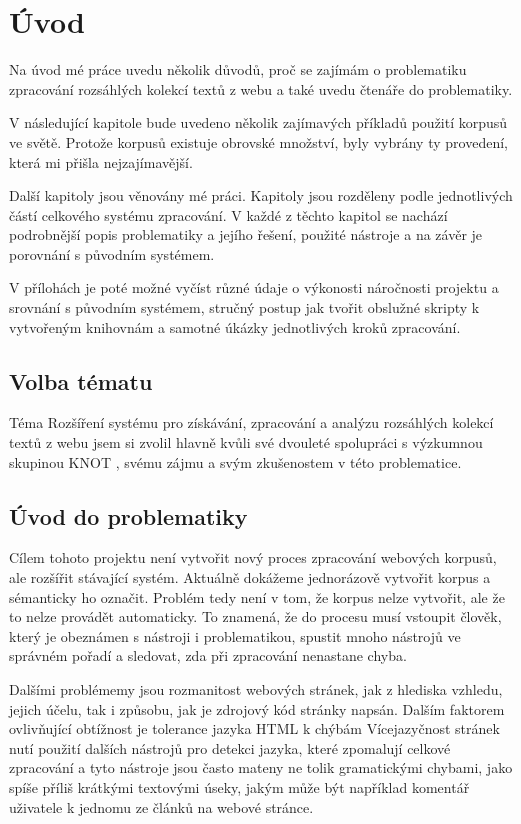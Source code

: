 
\chapter{Úvod}
Na úvod mé práce uvedu několik důvodů, proč se zajímám o problematiku zpracování
rozsáhlých kolekcí textů z webu a také uvedu čtenáře do problematiky.

V následující kapitole bude uvedeno několik zajímavých příkladů použití korpusů ve světě.
Protože korpusů existuje obrovské množství, byly vybrány ty provedení, která mi přišla
nejzajímavější.

Další kapitoly jsou věnovány mé práci. Kapitoly jsou rozděleny podle jednotlivých částí celkového
systému zpracování. V každé z těchto kapitol se nachází podrobnější popis
problematiky a jejího řešení, použité nástroje a na závěr je porovnání
s původním systémem.

V přílohách je poté možné vyčíst různé údaje o výkonosti náročnosti projektu a srovnání s původním systémem,
stručný postup jak tvořit obslužné skripty k vytvořeným knihovnám a
samotné úkázky jednotlivých kroků zpracování.

\section{Volba tématu}
Téma Rozšíření systému pro získávání, zpracování a analýzu rozsáhlých kolekcí textů z webu
jsem si zvolil hlavně kvůli své dvouleté spolupráci s výzkumnou skupinou KNOT \cite{KNOT}, svému zájmu a
svým zkušenostem v této problematice.

\section{Úvod do problematiky}
Cílem tohoto projektu není vytvořit nový proces zpracování webových korpusů, ale rozšířit stávající
systém. Aktuálně dokážeme jednorázově vytvořit korpus a sémanticky ho označit. Problém tedy není v tom,
že korpus nelze vytvořit, ale že to nelze provádět automaticky. To znamená, že do procesu musí vstoupit
člověk, který je obeznámen s nástroji i problematikou, spustit mnoho nástrojů ve správném pořadí a
sledovat, zda při zpracování nenastane chyba.

Dalšími problémemy jsou rozmanitost webových stránek, jak z hlediska vzhledu, jejich účelu, tak i
způsobu, jak je zdrojový kód stránky napsán. Dalším faktorem ovlivňující obtížnost je tolerance jazyka HTML k chýbám
Vícejazyčnost stránek nutí použití dalších nástrojů pro detekci jazyka, které zpomalují celkové zpracování
a tyto nástroje jsou často mateny ne tolik gramatickými chybami, jako spíše příliš krátkými textovými úseky,
jakým může být například komentář uživatele k jednomu ze článků na webové stránce.


